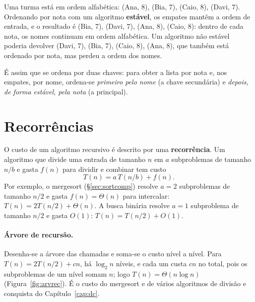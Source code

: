\begin{exemplo}\label{ex:estavel}
Uma turma está em ordem alfabética: (Ana, 8), (Bia, 7), (Caio, 8), (Davi, 7). Ordenando por nota com um algoritmo \textbf{estável}, os empates mantêm a ordem de entrada, e o resultado é (Bia, 7), (Davi, 7), (Ana, 8), (Caio, 8): dentro de cada nota, os nomes continuam em ordem alfabética. Um algoritmo não estável poderia devolver (Davi, 7), (Bia, 7), (Caio, 8), (Ana, 8), que também está ordenado por nota, mas perdeu a ordem dos nomes.

É assim que se ordena por duas chaves: para obter a lista por nota e, nos empates, por nome, ordena-se \emph{primeiro pelo nome} (a chave secundária) e \emph{depois, de forma estável, pela nota} (a principal).
\end{exemplo}

\section{Recorrências}\label{sec:recorrencias}
O custo de um algoritmo recursivo é descrito por uma \textbf{recorrência}. Um algoritmo que divide uma entrada de tamanho $n$ em $a$ subproblemas de tamanho $n/b$ e gasta $f(n)$ para dividir e combinar tem custo
\[
T(n)=a\,T(n/b)+f(n).
\]
Por exemplo, o mergesort (§\ref{sec:sortcomp}) resolve $a=2$ subproblemas de tamanho $n/2$ e gasta $f(n)=\Theta(n)$ para intercalar: $T(n)=2T(n/2)+\Theta(n)$. A busca binária resolve $a=1$ subproblema de tamanho $n/2$ e gasta $O(1)$: $T(n)=T(n/2)+O(1)$.

\paragraph{Árvore de recursão.} Desenha-se a árvore das chamadas e soma-se o custo nível a nível. Para $T(n)=2T(n/2)+cn$, há $\log_2n$ níveis, e cada um custa $cn$ no total, pois os subproblemas de um nível somam $n$; logo $T(n)=\Theta(n\log n)$ (Figura~\ref{fig:arvrec}). É o custo do mergesort e de vários algoritmos de divisão e conquista do Capítulo~\ref{cap:dc}.

